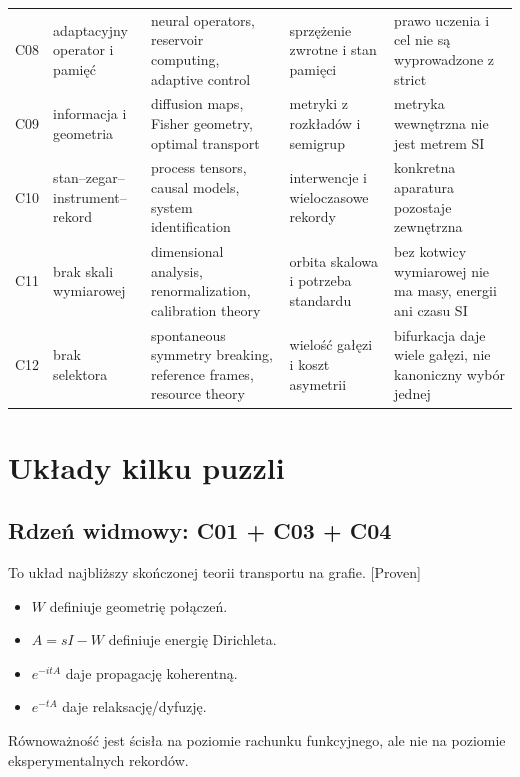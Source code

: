 \documentclass[11pt,a4paper,openany]{report}
\newcommand{\statusProven}{\textcolor{fingreen}{[Proven]}}
\begin{document}
\begin{center}
\begin{longtable}{@{}p{}p{}p{}p{}p{}@{}}
C08 & adaptacyjny operator i pamięć & neural operators, reservoir computing, adaptive control & sprzę\.zenie zwrotne i stan pamięci & prawo uczenia i cel nie są wyprowadzone z strict \\
C09 & informacja i geometria & diffusion maps, Fisher geometry, optimal transport & metryki z rozkładów i semigrup & metryka wewnętrzna nie jest metrem SI \\
C10 & stan--zegar--instrument--rekord & process tensors, causal models, system identification & interwencje i wieloczasowe rekordy & konkretna aparatura pozostaje zewnętrzna \\
C11 & brak skali wymiarowej & dimensional analysis, renormalization, calibration theory & orbita skalowa i potrzeba standardu & bez kotwicy wymiarowej nie ma masy, energii ani czasu SI \\
C12 & brak selektora & spontaneous symmetry breaking, reference frames, resource theory & wielość gałęzi i koszt asymetrii & bifurkacja daje wiele gałęzi, nie kanoniczny wybór jednej \\
\bottomrule
\end{longtable}
\endgroup
\end{center}

\chapter{Układy kilku puzzli}

\section{Rdzeń widmowy: C01 + C03 + C04}

To układ najbli\.zszy skończonej teorii transportu na grafie. \statusProven{}

\begin{itemize}
\item 
\(W\) definiuje geometrię połączeń.

\item 
\(A=sI-W\) definiuje energię Dirichleta.

\item 
\(e^{-itA}\) daje propagację koherentną.

\item 
\(e^{-tA}\) daje relaksację/\allowbreak{}dyfuzję.

\end{itemize}

Równowa\.zność jest ścisła na poziomie rachunku funkcyjnego, ale nie na poziomie eksperymentalnych rekordów.
\end{document}
